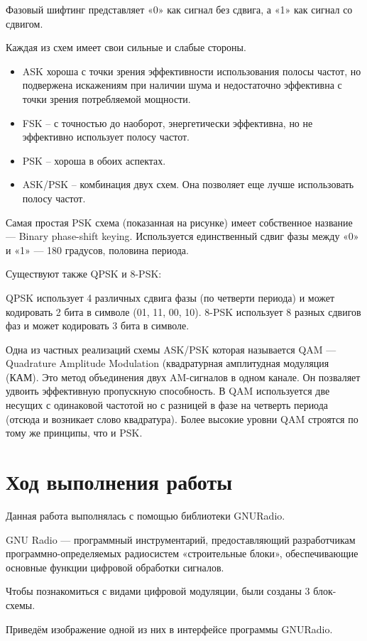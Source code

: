 Фазовый шифтинг представляет «0» как сигнал без сдвига, а «1» как сигнал со сдвигом.

Каждая из схем имеет свои сильные и слабые стороны.
\begin{itemize}
	\item ASK хороша с точки зрения эффективности использования полосы частот, но подвержена искажениям при наличии шума и недостаточно эффективна с точки зрения потребляемой мощности.
	\item FSK – с точностью до наоборот, энергетически эффективна, но не эффективно использует полосу частот.
	\item PSK – хороша в обоих аспектах.
	\item ASK/PSK – комбинация двух схем. Она позволяет еще лучше использовать полосу частот.
\end{itemize}

Самая простая PSK схема (показанная на рисунке) имеет собственное название — Binary phase-shift keying. Используется единственный сдвиг фазы между «0» и «1» — 180 градусов, половина периода.

Существуют также QPSK и 8-PSK:

QPSK использует 4 различных сдвига фазы (по четверти периода) и может кодировать 2 бита в символе (01, 11, 00, 10). 8-PSK использует 8 разных сдвигов фаз и может кодировать 3 бита в символе. 

Одна из частных реализаций схемы ASK/PSK которая называется QAM — Quadrature Amplitude Modulation (квадратурная амплитудная модуляция (КАМ). Это метод объединения двух AM-сигналов в одном канале. Он позваляет удвоить эффективную пропускную способность. В QAM используется две несущих с одинаковой частотой но с разницей в фазе на четверть периода (отсюда и возникает слово квадратура). Более высокие уровни QAM строятся по тому же принципы, что и PSK.

\newpage
\section{Ход выполнения работы}
Данная работа выполнялась с помощью библиотеки GNURadio.

GNU Radio — программный инструментарий, предоставляющий разработчикам программно-определяемых радиосистем «строительные блоки», обеспечивающие основные функции цифровой обработки сигналов.

Чтобы познакомиться с видами цифровой модуляции, были созданы 3 блок-схемы.

Приведём изображение одной из них в интерфейсе программы GNURadio.


